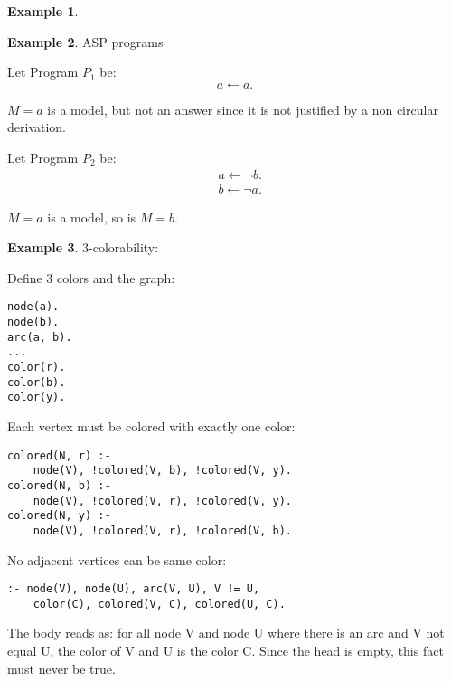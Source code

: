 \documentclass[landscape, letterpaper]{extarticle}
\theoremstyle{definition}
\newtheorem{example}{Example}
\begin{document}
\begin{multicols}{3}
\begin{example}
    \end{example}


    \begin{example}
        ASP programs


        Let Program \(P_1\) be:
        \[ a \leftarrow a. \]

        \(M = {a}\) is a model, but not an answer since it is not justified by a non circular derivation.

        Let Program \(P_2\) be:
        \begin{align*}
            &a \leftarrow \neg b.\\
            &b \leftarrow \neg a. 
        \end{align*}

        \(M = {a}\) is a model, so is \(M = {b}\).
    \end{example}

    \begin{example}
        3-colorability:

Define 3 colors and the graph:
\begin{verbatim}
node(a).
node(b).
arc(a, b).
...
color(r).
color(b).
color(y).
\end{verbatim}

Each vertex must be colored with exactly one color:
\begin{verbatim}
colored(N, r) :-
    node(V), !colored(V, b), !colored(V, y).
colored(N, b) :-
    node(V), !colored(V, r), !colored(V, y).
colored(N, y) :-
    node(V), !colored(V, r), !colored(V, b).
\end{verbatim}

No adjacent vertices can be same color:
\begin{verbatim}
:- node(V), node(U), arc(V, U), V != U,
    color(C), colored(V, C), colored(U, C).
\end{verbatim}
The body reads as: for all node V and node U where there is an arc and V not equal U, the color of V and U is the color C. Since the head is empty, this fact must never be true.
\end{example}

\end{multicols}
\end{document}
